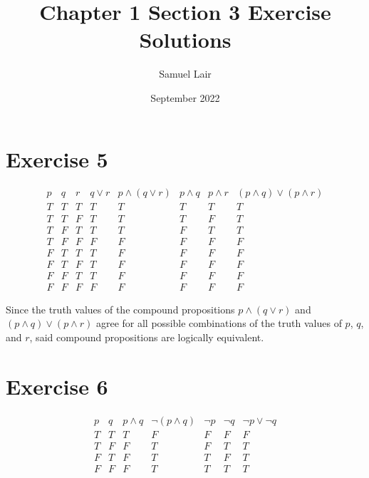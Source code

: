 \documentclass{article}
\title{Chapter 1 Section 3 Exercise Solutions}
\author{Samuel Lair}
\date{September 2022}
\begin{document}
\maketitle
\tableofcontents

\pagebreak

\section{Exercise 5}
\[
	\begin{array}{|c|c|c|c|c|c|c|c|}
		p & q & r & q \lor r & p \land (q \lor r) & p \land q & p \land r & (p \land q) \lor (p \land r) \\
		\hline
		T & T & T & T        & T                  & T         & T         & T                            \\
		T & T & F & T        & T                  & T         & F         & T                            \\
		T & F & T & T        & T                  & F         & T         & T                            \\
		T & F & F & F        & F                  & F         & F         & F                            \\
		F & T & T & T        & F                  & F         & F         & F                            \\
		F & T & F & T        & F                  & F         & F         & F                            \\
		F & F & T & T        & F                  & F         & F         & F                            \\
		F & F & F & F        & F                  & F         & F         & F
	\end{array}
\]

Since the truth values of the compound propositions $p \land (q \lor r)$ and $(p \land q) \lor (p \land r)$ agree for all possible combinations of the truth values of $p$, $q$, and $r$, said compound propositions are logically equivalent.

\section{Exercise 6}
\[
	\begin{array}{|c|c|c|c|c|c|c|}
		p & q & p \land q & \neg (p \land q) & \neg p & \neg q & \neg p \lor \neg q \\
		\hline
		T & T & T         & F                & F      & F      & F                  \\
		T & F & F         & T                & F      & T      & T                  \\
		F & T & F         & T                & T      & F      & T                  \\
		F & F & F         & T                & T      & T      & T
	\end{array}
\]
\end{document}
